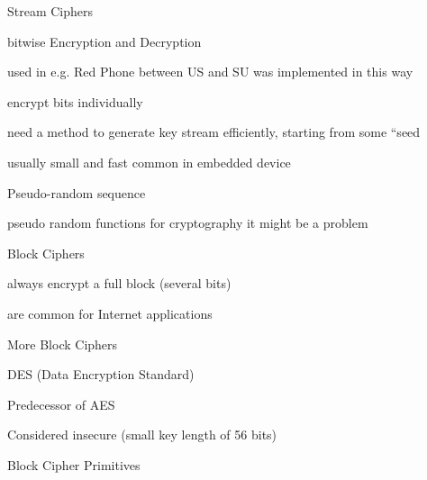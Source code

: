 \documentclass[landscape, a4paper]{article}
\begin{document}
\begin{minipage}[t]{0.19\pagewidth}
	\begin{betterlist}
		\item \alert{Stream Ciphers}
		\begin{betterlist}
			\item bitwise Encryption and Decryption
			\item used in e.g. Red Phone between US and SU was implemented in this way
			\item encrypt bits individually
			\item need a method to generate key stream efficiently, starting from some “seed
			\item usually small and fast common in embedded device
		\end{betterlist}
		\begin{betterlist}
			\item Pseudo-random sequence
			\begin{betterlist}
				\item pseudo random functions for cryptography it might be a problem
			\end{betterlist}
		\end{betterlist}
	\end{betterlist}
	\begin{betterlist}
		\item \alert{Block Ciphers}
		\begin{betterlist}
			\item always encrypt a full block (several bits)
			\item are common for Internet applications
		\end{betterlist}
		\begin{betterlist}
			\item More Block Ciphers
			\begin{betterlist}
				\item DES (Data Encryption Standard)
				\begin{betterlist}
					\item Predecessor of AES
					\item Considered insecure (small key length of 56 bits)
				\end{betterlist}
			\end{betterlist}
		\end{betterlist}
		\begin{betterlist}
			\item Block Cipher Primitives

\end{betterlist}
\end{betterlist}
\end{minipage}
\end{document}
